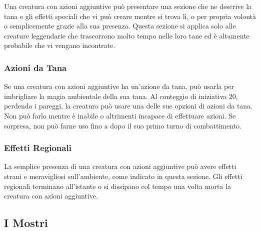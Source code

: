 \begin{multicols}{2}
Una creatura con azioni aggiuntive può presentare una sezione che ne descrive la tana e gli effetti speciali che vi può  creare mentre si trova lì, o per propria volontà o  semplicemente grazie alla sua presenza. Questa  sezione si applica solo alle creature leggendarie che  trascorrono molto tempo nelle loro tane ed è altamente  probabile che vi vengano incontrate.

\subsubsection{Azioni da Tana}

Se una creatura con azioni aggiuntive ha un'azione da tana, può  usarla per imbrigliare la magia ambientale della sua  tana. Al conteggio di iniziativa 20, perdendo i pareggi,  la creatura può usare una delle sue opzioni di azioni da  tana. Non può farlo mentre è inabile o altrimenti  incapace di effettuare azioni. Se sorpresa, non può  farne uso fino a dopo il suo primo turno di combattimento.

\subsubsection{Effetti Regionali}

La semplice presenza di una creatura con azioni aggiuntive può  avere effetti strani e meravigliosi sull'ambiente, come  indicato in questa sezione. Gli effetti regionali terminano all'istante o si dissipano col tempo una volta  morta la creatura con azioni aggiuntive.

\subsection{I Mostri}

\pagebreak


\end{multicols}
